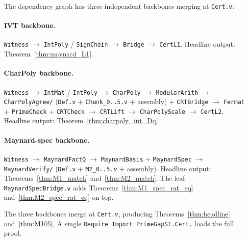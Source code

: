 The dependency graph has three independent backbones merging at
\texttt{Cert.v}:

\paragraph{IVT backbone.}
\texttt{Witness} $\to$ \texttt{IntPoly} / \texttt{SignChain} $\to$
\texttt{Bridge} $\to$ \texttt{CertL1}.
Headline output: Theorem~\ref{thm:maynard_L1}.

\paragraph{CharPoly backbone.}
\texttt{Witness} $\to$ \texttt{IntMat} / \texttt{IntPoly} $\to$
\texttt{CharPoly} $\to$ \texttt{ModularArith} $\to$
\texttt{CharPolyAgree/} (\texttt{Def.v} + \texttt{Chunk\_0..5.v} +
assembly) + \texttt{CRTBridge} $\to$ \texttt{Fermat} +
\texttt{PrimeCheck} + \texttt{CRTCheck} $\to$ \texttt{CRTLift}
$\to$ \texttt{CharPolyScale} $\to$ \texttt{CertL2}.
Headline output: Theorem~\ref{thm:charpoly_int_Dq}.

\paragraph{Maynard-spec backbone.}
\texttt{Witness} $\to$ \texttt{MaynardFactQ} $\to$
\texttt{MaynardBasis} + \texttt{MaynardSpec} $\to$
\texttt{MaynardVerify/} (\texttt{Def.v} + \texttt{M2\_0..5.v} +
assembly). Headline output: Theorems~\ref{thm:M1_match}
and~\ref{thm:M2_match}. The leaf \texttt{MaynardSpecBridge.v} adds
Theorems~\ref{thm:M1_spec_rat_eq} and~\ref{thm:M2_spec_rat_eq} on top.

The three backbones merge at \texttt{Cert.v}, producing
Theorems~\ref{thm:headline} and~\ref{thm:M105}. A single
\texttt{Require Import PrimeGapS1.Cert.} loads the full proof.
